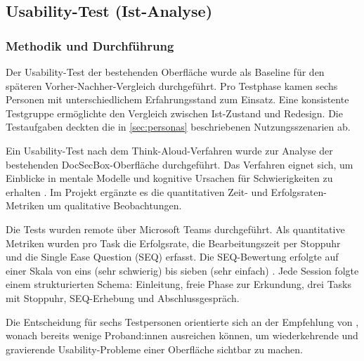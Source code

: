 \subsection{Usability-Test (Ist-Analyse)}\label{sec:usability_test}

\subsubsection{Methodik und Durchführung}\label{subsec:methodik}

Der Usability-Test der bestehenden Oberfläche wurde als Baseline für den späteren Vorher-Nachher-Vergleich durchgeführt. Pro Testphase kamen sechs Personen mit unterschiedlichem Erfahrungsstand zum Einsatz. Eine konsistente Testgruppe ermöglichte den Vergleich zwischen Ist-Zustand und Redesign. Die Testaufgaben deckten die in \autoref{sec:personas} beschriebenen Nutzungsszenarien ab.

Ein Usability-Test nach dem Think-Aloud-Verfahren wurde zur Analyse der bestehenden DocSecBox-Oberfläche durchgeführt. Das Verfahren eignet sich, um Einblicke in mentale Modelle und kognitive Ursachen für Schwierigkeiten zu erhalten \parencite[Kap.~6.8]{nielsenUsabilityEngineering1993}. Im Projekt ergänzte es die quantitativen Zeit- und Erfolgsraten-Metriken um qualitative Beobachtungen.

Die Tests wurden remote über Microsoft Teams durchgeführt. Als quantitative Metriken wurden pro Task die Erfolgsrate, die Bearbeitungszeit per Stoppuhr und die Single Ease Question (SEQ) erfasst. Die SEQ-Bewertung erfolgte auf einer Skala von eins (sehr schwierig) bis sieben (sehr einfach) \parencite[Kap.~8]{sauroLewisQuantifying2016}. Jede Session folgte einem strukturierten Schema: Einleitung, freie Phase zur Erkundung, drei Tasks mit Stoppuhr, SEQ-Erhebung und Abschlussgespräch.

Die Entscheidung für sechs Testpersonen orientierte sich an der Empfehlung von \textcite[Kap.~17.2.2]{erlhoferWebsiteKonzeptionUndRelaunch2017}, wonach bereits wenige Proband:innen ausreichen können, um wiederkehrende und gravierende Usability-Probleme einer Oberfläche sichtbar zu machen.

